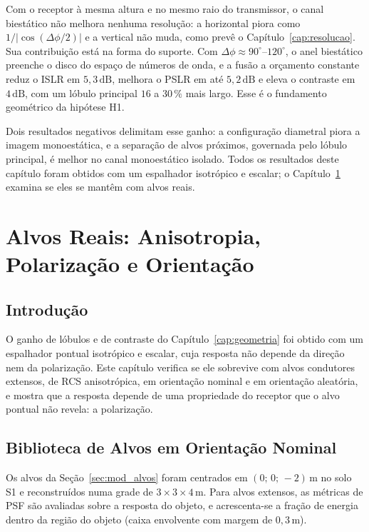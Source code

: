 \documentclass[12pt,a4paper,oneside]{book}
\theoremstyle{remark}
\newcommand{\dB}{\,\mathrm{dB}}
\theoremstyle{plain}
\theoremstyle{definition}
\begin{document}
Com o receptor à mesma altura e no mesmo raio do transmissor, o canal biestático
não melhora nenhuma resolução: a horizontal piora como $1/|\cos(\Delta\phi/2)|$ e a
vertical não muda, como prevê o Capítulo~\ref{cap:resolucao}. Sua contribuição está
na forma do suporte. Com $\Delta\phi\approx90^\circ$--$120^\circ$, o anel biestático
preenche o disco do espaço de números de onda, e a fusão a orçamento constante
reduz o ISLR em $5,3\dB$, melhora o PSLR em até $5,2\dB$ e eleva o contraste em
$4\dB$, com um lóbulo principal $16$ a $30\,\%$ mais largo. Esse é o fundamento
geométrico da hipótese H1.

Dois resultados negativos delimitam esse ganho: a configuração diametral piora a
imagem monoestática, e a separação de alvos próximos, governada pelo lóbulo
principal, é melhor no canal monoestático isolado. Todos os resultados deste
capítulo foram obtidos com um espalhador isotrópico e escalar; o
Capítulo~\ref{cap:alvos} examina se eles se mantêm com alvos reais.

\chapter{Alvos Reais: Anisotropia, Polarização e Orientação}
\label{cap:alvos}

\section{Introdução}
\label{sec:alv_intro}

O ganho de lóbulos e de contraste do Capítulo~\ref{cap:geometria} foi obtido com
um espalhador pontual isotrópico e escalar, cuja resposta não depende da
direção nem da polarização. Este capítulo verifica se ele sobrevive com alvos
condutores extensos, de RCS anisotrópica, em orientação nominal e em orientação
aleatória, e mostra que a resposta depende de uma propriedade do receptor que o
alvo pontual não revela: a polarização.

\section{Biblioteca de Alvos em Orientação Nominal}
\label{sec:alv_nominal}

Os alvos da Seção~\ref{sec:mod_alvos} foram centrados em $(0;\,0;\,-2)\,$m no
solo S1 e reconstruídos numa grade de $3\times3\times4\,$m. Para alvos extensos,
as métricas de PSF são avaliadas sobre a resposta do objeto, e acrescenta-se a
fração de energia dentro da região do objeto (caixa envolvente com margem de
$0,3\,$m).
\end{document}
